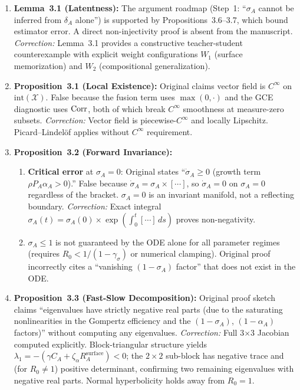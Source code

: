 
\begin{enumerate}

\item \textbf{Lemma~3.1 (Latentness):}
  The argument roadmap (Step~1: ``$\sigma_A$ cannot be inferred from
  $\delta_A$ alone'') is supported by Propositions~3.6--3.7, which bound
  estimator error. A direct non-injectivity proof is absent from the manuscript.
  \textit{Correction:} Lemma~3.1 provides a constructive teacher-student
  counterexample with explicit weight configurations $W_1$ (surface
  memorization) and $W_2$ (compositional generalization).

\item \textbf{Proposition~3.1 (Local Existence):}
  Original claims vector field is $C^\infty$ on $\text{int}(\mathcal{X})$.
  False because the fusion term uses $\max(0,\cdot)$ and
  the GCE diagnostic uses $\operatorname{Corr}$, both of which break $C^\infty$
  smoothness at measure-zero subsets.
  \textit{Correction:} Vector field is piecewise-$C^\infty$ and locally
  Lipschitz. Picard--Lindelöf applies without $C^\infty$ requirement.

\item \textbf{Proposition~3.2 (Forward Invariance):}
  \begin{enumerate}
  \item \textbf{Critical error} at $\sigma_A = 0$: Original states
    ``$\dot{\sigma}_A \geq 0$ (growth term $\rho P_A \alpha_A > 0$).''
    False because $\dot{\sigma}_A = \sigma_A \times [\cdots]$, so
    $\dot{\sigma}_A = 0$ on $\sigma_A = 0$ regardless of the bracket.
    $\sigma_A = 0$ is an invariant manifold, not a reflecting boundary.
    \textit{Correction:} Exact integral $\sigma_A(t) = \sigma_A(0) \times
    \exp(\int_0^t [\cdots]\,ds)$ proves non-negativity.
  \item $\sigma_A \leq 1$ is not guaranteed by the ODE alone for all
    parameter regimes (requires $R_0 < 1/(1 - \gamma_\sigma)$ or
    numerical clamping). Original proof incorrectly cites a
    ``vanishing $(1-\sigma_A)$ factor'' that does not exist in the ODE.
  \end{enumerate}

\item \textbf{Proposition~3.3 (Fast-Slow Decomposition):}
  Original proof sketch claims ``eigenvalues have
  strictly negative real parts (due to the saturating nonlinearities
  in the Gompertz efficiency and the $(1-\sigma_A)$, $(1-\alpha_A)$
  factors)'' without computing any eigenvalues.
  \textit{Correction:} Full 3$\times$3 Jacobian computed explicitly.
  Block-triangular structure yields $\lambda_1 = -(\gamma C_A +
  \zeta_\alpha R_A^{\text{surface}}) < 0$; the $2\times2$ sub-block
  has negative trace and (for $R_0 \neq 1$) positive determinant,
  confirming two remaining eigenvalues with negative real parts.
  Normal hyperbolicity holds away from $R_0 = 1$.


\end{enumerate}
